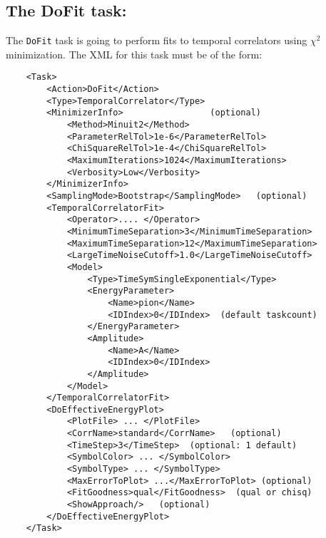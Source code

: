 \documentclass[12pt,notitlepage,letterpaper]{article}
\newcommand{\vb}{\texttt}
\begin{document}
\subsection{The DoFit task:}
The \vb{DoFit} task is going to perform fits to temporal correlators
using $\chi^2$ minimization.
The XML for this task must be of the form:
\begin{verbatim}
    <Task>
        <Action>DoFit</Action>
        <Type>TemporalCorrelator</Type>
        <MinimizerInfo>                 (optional)
            <Method>Minuit2</Method>
            <ParameterRelTol>1e-6</ParameterRelTol>
            <ChiSquareRelTol>1e-4</ChiSquareRelTol>
            <MaximumIterations>1024</MaximumIterations>
            <Verbosity>Low</Verbosity>
        </MinimizerInfo>
        <SamplingMode>Bootstrap</SamplingMode>   (optional)
        <TemporalCorrelatorFit>
            <Operator>.... </Operator>
            <MinimumTimeSeparation>3</MinimumTimeSeparation>
            <MaximumTimeSeparation>12</MaximumTimeSeparation>
            <LargeTimeNoiseCutoff>1.0</LargeTimeNoiseCutoff>
            <Model>
                <Type>TimeSymSingleExponential</Type>
                <EnergyParameter>
                    <Name>pion</Name>
                    <IDIndex>0</IDIndex>  (default taskcount)
                </EnergyParameter>
                <Amplitude>
                    <Name>A</Name>
                    <IDIndex>0</IDIndex>
                </Amplitude>
            </Model>
        </TemporalCorrelatorFit>
        <DoEffectiveEnergyPlot>
            <PlotFile> ... </PlotFile>
            <CorrName>standard</CorrName>   (optional)
            <TimeStep>3</TimeStep>  (optional: 1 default)
            <SymbolColor> ... </SymbolColor>
            <SymbolType> ... </SymbolType>
            <MaxErrorToPlot> ...</MaxErrorToPlot> (optional)
            <FitGoodness>qual</FitGoodness>  (qual or chisq)
            <ShowApproach/>   (optional)
        </DoEffectiveEnergyPlot>
    </Task>
\end{verbatim}
\end{document}
